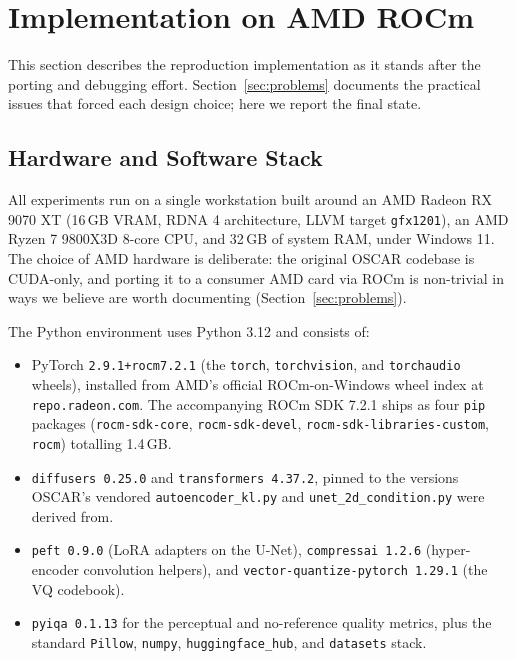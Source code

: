 \documentclass[conference]{IEEEtran}
\begin{document}
\section{Implementation on AMD ROCm}
\label{sec:implementation}

This section describes the reproduction implementation as it stands after the
porting and debugging effort. Section~\ref{sec:problems} documents the practical
issues that forced each design choice; here we report the final state.

\subsection{Hardware and Software Stack}

All experiments run on a single workstation built around an AMD Radeon
RX 9070 XT (16\,GB VRAM, RDNA 4 architecture, LLVM target \texttt{gfx1201}),
an AMD Ryzen 7 9800X3D 8-core CPU, and 32\,GB of system RAM, under Windows 11.
The choice of AMD hardware is deliberate: the original OSCAR codebase is
CUDA-only, and porting it to a consumer AMD card via ROCm is non-trivial in
ways we believe are worth documenting (Section~\ref{sec:problems}).

The Python environment uses Python 3.12 and consists of:
\begin{itemize}
  \item PyTorch \texttt{2.9.1+rocm7.2.1} (the \texttt{torch}, \texttt{torchvision},
        and \texttt{torchaudio} wheels), installed from AMD's official
        ROCm-on-Windows wheel index at \texttt{repo.radeon.com}. The
        accompanying ROCm SDK 7.2.1 ships as four \texttt{pip} packages
        (\texttt{rocm-sdk-core}, \texttt{rocm-sdk-devel},
        \texttt{rocm-sdk-libraries-custom}, \texttt{rocm}) totalling 1.4\,GB.
  \item \texttt{diffusers 0.25.0} and \texttt{transformers 4.37.2}, pinned to the
        versions OSCAR's vendored \texttt{autoencoder\_kl.py} and
        \texttt{unet\_2d\_condition.py} were derived from.
  \item \texttt{peft 0.9.0} (LoRA adapters on the U-Net), \texttt{compressai 1.2.6}
        (hyper-encoder convolution helpers), and
        \texttt{vector-quantize-pytorch 1.29.1} (the VQ codebook).
  \item \texttt{pyiqa 0.1.13} for the perceptual and no-reference quality
        metrics, plus the standard \texttt{Pillow}, \texttt{numpy},
        \texttt{huggingface\_hub}, and \texttt{datasets} stack.
\end{itemize}
\end{document}
